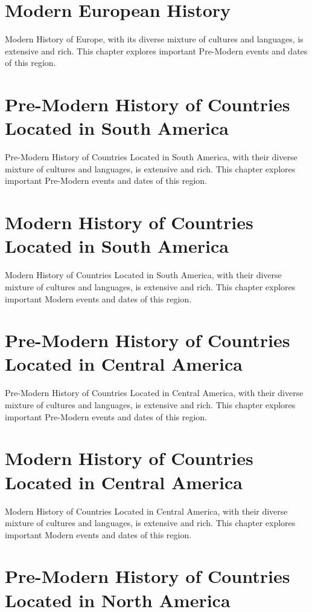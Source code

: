 \documentclass[a4paper,12pt]{book}
\begin{document}
\chapter{Modern European History}
Modern History of Europe, with its diverse mixture of cultures and languages, is extensive and rich. This chapter explores important Pre-Modern events and dates of this region.

\chapter{Pre-Modern History of Countries Located in South America}
Pre-Modern History of Countries Located in South America, with their diverse mixture of cultures and languages, is extensive and rich. This chapter explores important Pre-Modern events and dates of this region.

\chapter{Modern History of Countries Located in South America}
Modern History of Countries Located in South America, with their diverse mixture of cultures and languages, is extensive and rich. This chapter explores important Modern events and dates of this region.

\chapter{Pre-Modern History of Countries Located in Central America}
Pre-Modern History of Countries Located in Central America, with their diverse mixture of cultures and languages, is extensive and rich. This chapter explores important Pre-Modern events and dates of this region.

\chapter{Modern History of Countries Located in Central America}
Modern History of Countries Located in Central America, with their diverse mixture of cultures and languages, is extensive and rich. This chapter explores important Modern events and dates of this region.

\chapter{Pre-Modern History of Countries Located in North America}
\label{ch:pre-modern-history-north-america}
\end{document}
